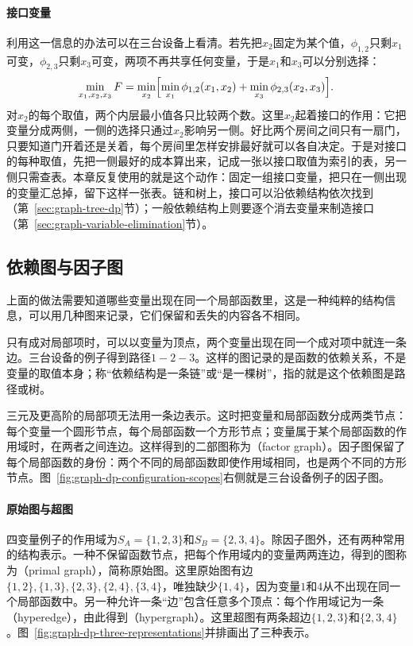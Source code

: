 \paragraph{接口变量}
利用这一信息的办法可以在三台设备上看清。若先把$x_2$固定为某个值，$\phi_{1,2}$只剩$x_1$可变，$\phi_{2,3}$只剩$x_3$可变，两项不再共享任何变量，于是$x_1$和$x_3$可以分别选择：
\[
\min_{x_1,x_2,x_3}F=\min_{x_2}\Bigl[\min_{x_1}\phi_{1,2}(x_1,x_2)+\min_{x_3}\phi_{2,3}(x_2,x_3)\Bigr].
\]
对$x_2$的每个取值，两个内层最小值各只比较两个数。这里$x_2$起着接口的作用：它把变量分成两侧，一侧的选择只通过$x_2$影响另一侧。好比两个房间之间只有一扇门，只要知道门开着还是关着，每个房间里怎样安排最好就可以各自决定。于是对接口的每种取值，先把一侧最好的成本算出来，记成一张以接口取值为索引的表，另一侧只需查表。本章反复使用的就是这个动作：固定一组接口变量，把只在一侧出现的变量汇总掉，留下这样一张表。链和树上，接口可以沿依赖结构依次找到（第~\ref{sec:graph-tree-dp}节）；一般依赖结构上则要逐个消去变量来制造接口（第~\ref{sec:graph-variable-elimination}节）。

\subsection{依赖图与因子图}
\label{sec:graph-dp-factor-graphs}

上面的做法需要知道哪些变量出现在同一个局部函数里，这是一种纯粹的结构信息，可以用几种图来记录，它们保留和丢失的内容各不相同。

只有成对局部项时，可以以变量为顶点，两个变量出现在同一个成对项中就连一条边。三台设备的例子得到路径$1-2-3$。这样的图记录的是函数的依赖关系，不是变量的取值本身；称“依赖结构是一条链”或“是一棵树”，指的就是这个依赖图是路径或树。

三元及更高阶的局部项无法用一条边表示。这时把变量和局部函数分成两类节点：每个变量一个圆形节点，每个局部函数一个方形节点；变量属于某个局部函数的作用域时，在两者之间连边。这样得到的二部图称为（factor graph）。因子图保留了每个局部函数的身份：两个不同的局部函数即使作用域相同，也是两个不同的方形节点。图~\ref{fig:graph-dp-configuration-scopes}右侧就是三台设备例子的因子图。

\paragraph{原始图与超图}
四变量例子的作用域为$S_A=\{1,2,3\}$和$S_B=\{2,3,4\}$。除因子图外，还有两种常用的结构表示。一种不保留函数节点，把每个作用域内的变量两两连边，得到的图称为（primal graph），简称原始图。这里原始图有边$\{1,2\},\allowbreak\{1,3\},\allowbreak\{2,3\},\allowbreak\{2,4\},\allowbreak\{3,4\}$，唯独缺少$\{1,4\}$，因为变量$1$和$4$从不出现在同一个局部函数中。另一种允许一条“边”包含任意多个顶点：每个作用域记为一条（hyperedge），由此得到（hypergraph）。这里超图有两条超边$\{1,2,3\}$和$\{2,3,4\}$。图~\ref{fig:graph-dp-three-representations}并排画出了三种表示。

